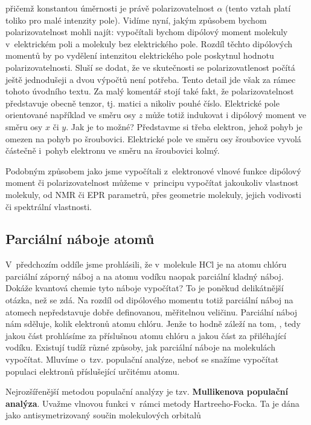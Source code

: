 \noindent přičemž konstantou úměrnosti je právě polarizovatelnost $\alpha$ (tento vztah platí toliko pro malé intenzity pole). Vidíme nyní, jakým způsobem bychom polarizovatelnost mohli najít: vypočítali bychom dipólový moment molekuly v~elektrickém poli a molekuly bez elektrického pole. Rozdíl těchto dipólových momentů by po vydělení intenzitou elektrického pole poskytnul hodnotu polarizovatelnosti. Sluší se dodat, že ve skutečnosti se polarizovatlenost počítá ještě jednodušeji a dvou výpočtů není potřeba. Tento detail jde však za rámec tohoto úvodního textu. Za malý komentář stojí také fakt, že polarizovatelnost představuje obecně tenzor, tj. matici a nikoliv pouhé číslo. Elektrické pole orientované například ve směru osy $z$ může totiž indukovat i dipólový moment ve směru osy $x$ či $y$. Jak je to možné? Představme si třeba elektron, jehož pohyb je omezen na pohyb po šroubovici. Elektrické pole ve směru osy šroubovice vyvolá částečně i~pohyb elektronu ve směru na šroubovici kolmý. 

Podobným způsobem jako jsme vypočítali z~elektronové vlnové funkce dipólový moment či polarizovatelnost můžeme v~principu vypočítat jakoukoliv vlastnost molekuly, od NMR či EPR parametrů, přes geometrie molekuly, jejich vodivosti či spektrální vlastnosti.  



\subsection{Parciální náboje atomů}

V~předchozím oddíle jsme prohlásili, že v~molekule HCl je na atomu chlóru parciální záporný náboj a na atomu vodíku naopak parciální kladný náboj. Dokáže kvantová chemie tyto náboje vypočítat? To je poněkud delikátnější otázka, než se zdá. Na rozdíl od dipólového momentu totiž parciální náboj na atomech nepředstavuje dobře definovanou, měřitelnou veličinu. Parciální náboj nám sděluje, kolik elektronů  atomu chlóru. Jenže to hodně záleží na tom, , tedy jakou část prohlásíme za příslušnou atomu chlóru a jakou část za přiléhající vodíku. Existují tudíž různé způsoby, jak parciální náboje na molekulách vypočítat. Mluvíme o~tzv. populační analýze, neboť se snažíme vypočítat populaci elektronů příslušející určitému atomu.

Nejrozšířenější metodou populační analýzy je tzv. \textbf{Mullikenova populační analýza}. Uvaž\-me vlnovou funkci v~rámci metody Hartreeho-Focka. Ta je dána jako antisymetrizovaný součin molekulových orbitalů

